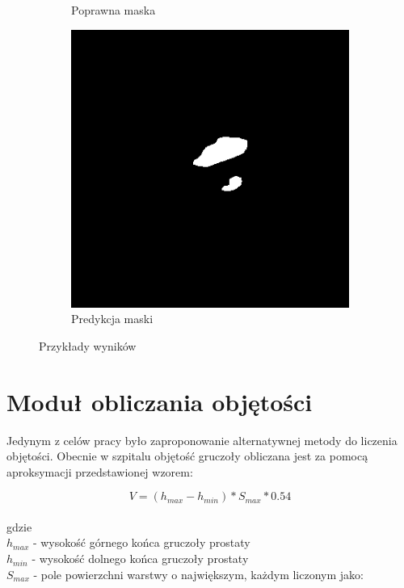 \documentclass[a4paper,11pt,twoside]{report}
\theoremstyle{definition}
\begin{document}
\begin{figure}[htb]
\begin{subfigure}{0.25\textwidth}
		\caption{Poprawna maska}
		\label{fig:5}
	\end{subfigure}\hfil %
	\begin{subfigure}{0.25\textwidth}
		\includegraphics[width=\linewidth]{segmentation/segmentation_mask_2.png}
		\caption{Predykcja maski}
		\label{fig:6}
	\end{subfigure}
	\caption{Przykłady wyników}
	\label{fig:images}
\end{figure}


\section{Moduł obliczania objętości}

Jedynym z celów pracy było zaproponowanie alternatywnej metody do liczenia objętości. Obecnie w szpitalu objętość gruczoły obliczana jest za pomocą aproksymacji przedstawionej wzorem:

\[V = (h_{max} - h_{min}) * S_{max} * 0.54\]
\\
gdzie 
\\
\(h_{max}\) - wysokość górnego końca gruczoły prostaty                     
\\
\(h_{min}\) - wysokość dolnego końca gruczoły prostaty                     
\\
\(S_{max}\) - pole powierzchni warstwy o największym, każdym liczonym jako:  
\end{document}
